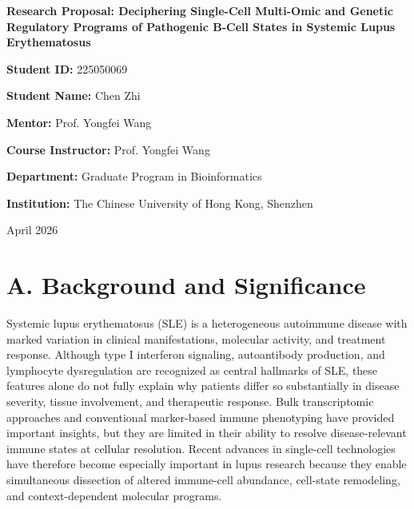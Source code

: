 

\begin{titlepage}
    \centering
    \vspace*{2cm}

    {\LARGE \bfseries Research Proposal: Deciphering Single-Cell Multi-Omic and Genetic Regulatory Programs of Pathogenic B-Cell States in Systemic Lupus Erythematosus\par}
    
    \vspace{2.5cm}
    
    {\Large \textbf{Student ID:} 225050069\par}
    \vspace{0.5cm}
    {\Large \textbf{Student Name:} Chen Zhi\par}
    \vspace{0.5cm}
    {\Large \textbf{Mentor:} Prof. Yongfei Wang\par}
    \vspace{0.5cm}
    {\Large \textbf{Course Instructor:} Prof. Yongfei Wang\par}
    \vspace{0.5cm}
    {\Large \textbf{Department:} Graduate Program in Bioinformatics\par}
    \vspace{0.5cm}
    {\Large \textbf{Institution:} The Chinese University of Hong Kong, Shenzhen\par}
    
    \vfill
    
    {\large April 2026\par}
\end{titlepage}

\newpage

\section*{A. Background and Significance}

Systemic lupus erythematosus (SLE) is a heterogeneous autoimmune disease with marked variation in clinical manifestations, molecular activity, and treatment response. Although type I interferon signaling, autoantibody production, and lymphocyte dysregulation are recognized as central hallmarks of SLE, these features alone do not fully explain why patients differ so substantially in disease severity, tissue involvement, and therapeutic response. Bulk transcriptomic approaches and conventional marker-based immune phenotyping have provided important insights, but they are limited in their ability to resolve disease-relevant immune states at cellular resolution. Recent advances in single-cell technologies have therefore become especially important in lupus research because they enable simultaneous dissection of altered immune-cell abundance, cell-state remodeling, and context-dependent molecular programs.

